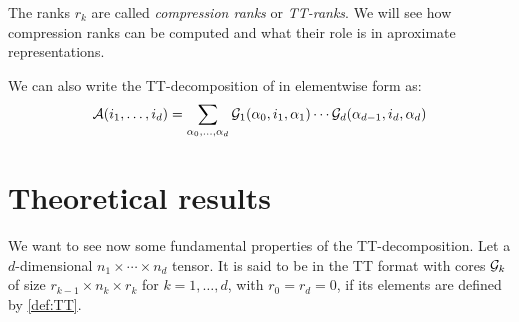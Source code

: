 The ranks $r_k$ are called \emph{compression ranks} or \emph{TT-ranks}. We will see how compression ranks can be computed and what their role is in aproximate representations.

We can also write the TT-decomposition of \A in elementwise form as:
\begin{equation} \label{def:TTindex}
  \mathcal{A}(i_1,\dots,i_d) = \sum_{\alpha_0,\dots,\alpha_d} \mathcal{G}_1(\alpha_0,i_1,\alpha_1) \cdots \mathcal{G}_d(\alpha_{d-1},i_d,\alpha_d)
\end{equation}

\section{Theoretical results}
We want to see now some fundamental properties of the TT-decomposition. Let \A a $d$-dimensional $n_1 \times \cdots \times n_d$ tensor. It is said to be in the TT format with cores $\mathcal{G}_k$ of size $r_{k-1} \times n_k \times r_k$ for $k=1,\ldots ,d$, with $r_0 = r_d = 0$, if its elements are defined by \eqref{def:TT}.

